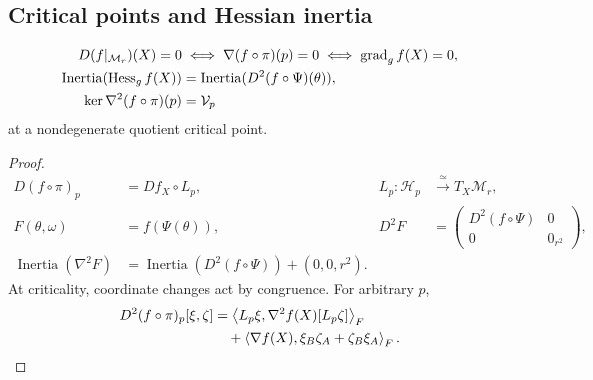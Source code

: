 \subsection{Critical points and Hessian inertia}
\begin{theorem}
\label{thm:landscape}
\begin{align}
D(f|_{\mathcal M_r})(X)=0
&\iff\nabla(f\circ\pi)(p)=0
\iff\operatorname{grad}_g f(X)=0,\\
\operatorname{Inertia}(\operatorname{Hess}_g f(X))
&=\operatorname{Inertia}(D^2(f\circ\Psi)(\theta)),\\
\ker\nabla^2(f\circ\pi)(p)&=\mathcal V_p
\end{align}
at a nondegenerate quotient critical point.
\end{theorem}
\begin{proof}
\begin{align}
D(f\circ\pi)_p&=Df_X\circ L_p,&
L_p:\mathcal H_p&\xrightarrow{\ \simeq\ }T_X\mathcal M_r,\\
F(\theta,\omega)&=f(\Psi(\theta)),&
D^2F&=\begin{pmatrix}D^2(f\circ\Psi)&0\\0&0_{r^2}\end{pmatrix},\\
\operatorname{Inertia}(\nabla^2F)
&=\operatorname{Inertia}(D^2(f\circ\Psi))+(0,0,r^2).
\end{align}
At criticality, coordinate changes act by congruence. For arbitrary $p$,
\begin{align}
D^2(f\circ\pi)_p[\xi,\zeta]
&=\left\langle L_p\xi,\nabla^2f(X)[L_p\zeta]\right\rangle_F\notag\\
&\quad+\left\langle\nabla f(X),\xi_B\zeta_A+\zeta_B\xi_A\right\rangle_F.
\label{eq:rigid-factor-hessian}
\end{align}
\end{proof}
